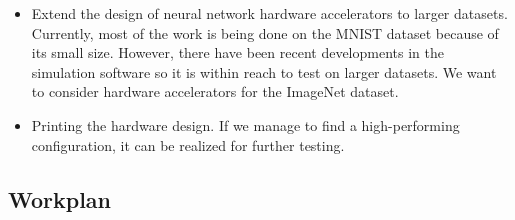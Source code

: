 \documentclass[a4paper, 11pt]{article}
\begin{document}
\begin{itemize}
\item
Extend the design of neural network hardware accelerators to larger datasets. Currently, most of the work is being done on the MNIST dataset because of its small size. However, there have been recent developments in the simulation software so it is within reach to test on larger datasets. We want to consider hardware accelerators for the ImageNet dataset.
\item
Printing the hardware design. If we manage to find a high-performing configuration, it can be realized for further testing.
\end{itemize}

\subsection*{Workplan}
\end{document}
